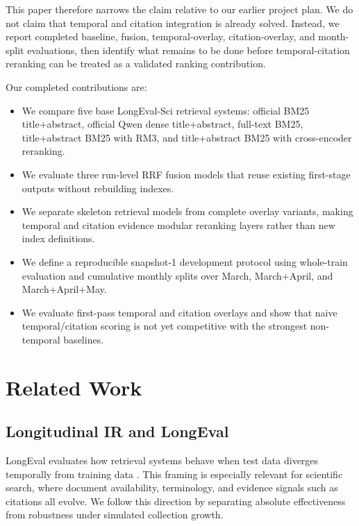 \documentclass[11pt]{article}
\begin{document}
This paper therefore narrows the claim relative to our earlier project plan. We do not claim that temporal and citation integration is already solved. Instead, we report completed baseline, fusion, temporal-overlay, citation-overlay, and month-split evaluations, then identify what remains to be done before temporal-citation reranking can be treated as a validated ranking contribution.

Our completed contributions are:
\begin{itemize}[leftmargin=1.5em]
    \item We compare five base LongEval-Sci retrieval systems: official BM25 title+abstract, official Qwen dense title+abstract, full-text BM25, title+abstract BM25 with RM3, and title+abstract BM25 with cross-encoder reranking.
    \item We evaluate three run-level RRF fusion models that reuse existing first-stage outputs without rebuilding indexes.
    \item We separate skeleton retrieval models from complete overlay variants, making temporal and citation evidence modular reranking layers rather than new index definitions.
    \item We define a reproducible snapshot-1 development protocol using whole-train evaluation and cumulative monthly splits over March, March+April, and March+April+May.
    \item We evaluate first-pass temporal and citation overlays and show that naive temporal/citation scoring is not yet competitive with the strongest non-temporal baselines.
\end{itemize}

\section{Related Work}

\subsection{Longitudinal IR and LongEval}

LongEval evaluates how retrieval systems behave when test data diverges temporally from training data \cite{cancellieri_longeval_2025_clean}. This framing is especially relevant for scientific search, where document availability, terminology, and evidence signals such as citations all evolve. We follow this direction by separating absolute effectiveness from robustness under simulated collection growth.
\end{document}
